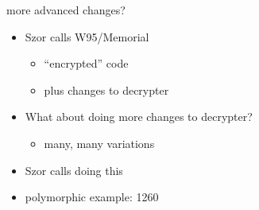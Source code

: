 
\begin{frame}{more advanced changes?}
    \begin{itemize}
    \item Szor calls W95/Memorial 
        \begin{itemize}
        \item ``encrypted'' code
        \item plus  changes to decrypter
        \end{itemize}
    \item What about doing more changes to decrypter?
        \begin{itemize}
        \item many, many variations
        \end{itemize}
    \item Szor calls doing this 
    \item polymorphic example: 1260
    \end{itemize}
\end{frame}

